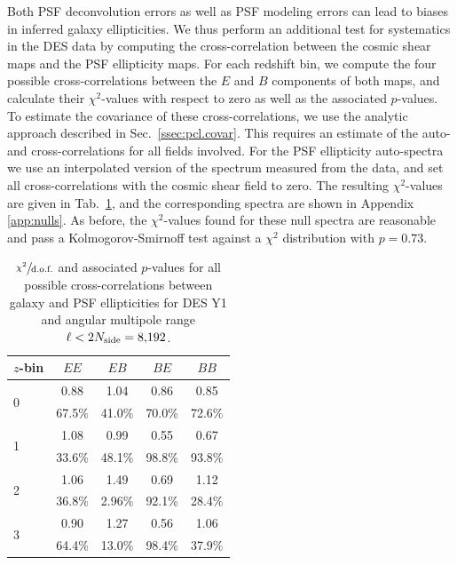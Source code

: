 \documentclass[a4paper,11pt]{article}
\newcommand{\Nside}{N_{\rm side}}
\newcommand{\dof}{\text{d.o.f.}}
\newcommand{\zbin}{$z$-bin\xspace}
\begin{document}
      Both PSF deconvolution errors as well as PSF modeling errors can lead to biases in inferred galaxy ellipticities. We thus perform an additional test for systematics in the DES data by computing the cross-correlation between the cosmic shear maps and the PSF ellipticity maps. For each redshift bin, we compute the four possible cross-correlations between the $E$ and $B$ components of both maps, and calculate their $\chi^2$-values with respect to zero as well as the associated $p$-values. To estimate the covariance of these cross-correlations, we use the analytic approach described in Sec.~\ref{ssec:pcl.covar}. This requires an estimate of the auto- and cross-correlations for all fields involved. For the PSF ellipticity auto-spectra we use an interpolated version of the spectrum measured from the data, and set all cross-correlations with the cosmic shear field to zero. The resulting $\chi^{2}$-values are given in Tab.~\ref{tab:des.psf}, and the corresponding spectra are shown in Appendix \ref{app:nulls}. As before, the $\chi^2$-values found for these null spectra are reasonable and pass a Kolmogorov-Smirnoff test against a $\chi^2$ distribution with $p=0.73$.

    \begin{table}
      \centering
      \begin{tabular}{|lcccc|}
        \hline
        \zbin & $EE$ & $EB$ & $BE$ & $BB$\\
        \hline
        \multirow{2}{*}{0} & 0.88 & 1.04 & 0.86 & 0.85\\
                           & 67.5\% & 41.0\% & 70.0\% & 72.6\% \\
        \hline
        \multirow{2}{*}{1} & 1.08 & 0.99 & 0.55 & 0.67\\
                           & 33.6\% & 48.1\% & 98.8\% & 93.8\% \\
        \hline
        \multirow{2}{*}{2} & 1.06 & 1.49 & 0.69 & 1.12\\
                           & 36.8\% & 2.96\% & 92.1\% & 28.4\% \\
        \hline
        \multirow{2}{*}{3} & 0.90 & 1.27 & 0.56 & 1.06\\
                           & 64.4\% & 13.0\% & 98.4\% & 37.9\% \\
        \hline
      \end{tabular}
      \caption{$\sfrac{\chi^2}{\dof}$ and associated $p$-values for all possible cross-correlations between galaxy and PSF ellipticities for DES Y1 and angular multipole range $\ell < 2\Nside=8{,}192$.}\label{tab:des.psf}
    \end{table}
    
\end{document}
